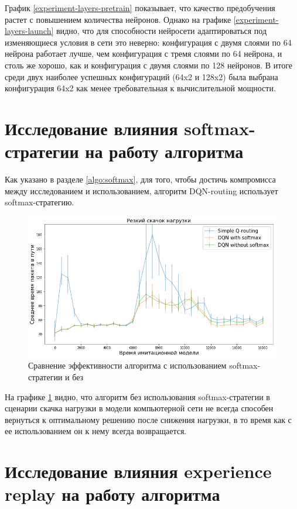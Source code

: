 \documentclass[specification, annotation]{itmo-student-thesis}
\begin{document}
График \ref{experiment-layers-pretrain} показывает, что качество предобучения
растет с повышением количества нейронов. Однако на графике
\ref{experiment-layers-launch} видно, что для способности нейросети
адаптироваться под изменяющиеся условия в сети это неверно: конфигурация с двумя
слоями по 64 нейрона работает лучше, чем конфигурация с тремя слоями по 64
нейрона, и столь же хорошо, как и конфигурация с двумя слоями по 128 нейронов. В
итоге среди двух наиболее успешных конфигураций (64x2 и 128x2) была выбрана
конфигурация 64x2 как менее требовательная к вычислительной мощности.

\section{Исследование влияния softmax-стратегии на работу алгоритма}\label{apx:softmax}

Как указано в разделе \ref{algo:softmax}, для того, чтобы достичь компромисса
между исследованием и использованием, алгоритм DQN-routing использует
softmax-стратегию.

\begin{figure}[!h]
  \caption{Сравнение эффективности алгоритма с использованием softmax-стратегии
    и без}\label{experiment-softmax-effect}
  \centering
  \includegraphics[scale=0.6]{experiment-softmax-effect}
\end{figure}

На графике \ref{experiment-softmax-effect} видно, что алгоритм без использования
softmax-стратегии в сценарии скачка нагрузки в модели компьютерной сети не
всегда способен вернуться к оптимальному решению после снижения нагрузки, в то
время как с ее использованием он к нему всегда возвращается.

\section{Исследование влияния experience replay на работу алгоритма}\label{apx:exp-replay}
\end{document}
